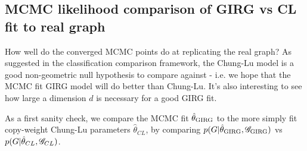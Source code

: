 \subsection{MCMC likelihood comparison of GIRG vs CL fit to real graph}
How well do the converged MCMC points do at replicating the real graph? As suggested in the classification comparison framework, the Chung-Lu model is a good non-geometric null hypothesis to compare against - i.e. we hope that the MCMC fit GIRG model will do better than Chung-Lu. It's also interesting to see how large a dimension $d$ is necessary for a good GIRG fit.

As a first sanity check, we compare the MCMC fit $\hat{\theta}_{\mathrm{GIRG}}$ to the more simply fit copy-weight Chung-Lu parameters $\hat{\theta}_{CL}$, by comparing $p(G | \hat{\theta}_{\mathrm{GIRG}}, \mathscr{G}_{\mathrm{GIRG}})$ vs $p(G | \hat{\theta}_{CL}, \mathscr{G}_{CL})$. 

